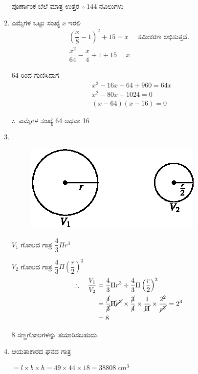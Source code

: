 \begin{enumerate}
ಪೂರ್ಣಾಂಕ ಬೆಲೆ ಮಾತ್ರ ಉತ್ತರ $\therefore~ 144$ ನವಿಲುಗಳು 

\item ಎಮ್ಮೆಗಳ ಒಟ್ಟು ಸಂಖ್ಯೆ $x$ ಇರಲಿ 
\begin{gather*}
\left(\dfrac{x}{8} - 1\right)^{2} + 15 = x \quad\text{ ಸಮೀಕರಣ ಲಭಿಸುತ್ತದೆ.}\\
\dfrac{x^{2}}{64} - \dfrac{x}{4} + 1 + 15 = x
\end{gather*}

64 ರಿಂದ ಗುಣಿಸಿದಾಗ 
\begin{align*}
& x^{2} - 16x + 64 + 960 = 64x\\
& x^{2} - 80x + 1024 = 0\\
& (x - 64) (x - 16) = 0
\end{align*}

$\therefore~$ ಎಮ್ಮೆಗಳ ಸಂಖ್ಯೆ 64 ಅಥವಾ  16

\item 
~

\begin{figure}[H]
\centering
\includegraphics[scale=1.1]{images/chap11/ans20.eps}
\end{figure}

$V_{1}$ ಗೋಲದ ಗಾತ್ರ $\dfrac{4}{3} \Pi r^{3}$

$V_{2}$ ಗೋಲದ ಗಾತ್ರ $\dfrac{4}{3} \Pi \left(\dfrac{r}{2}\right)^{3}$
\begin{align*}
\therefore\quad\dfrac{V_{1}}{V_{2}} & = \dfrac{4}{3}\Pi r^{3} \div {\dfrac{4}{3}\Pi \left(\dfrac{r}{2}\right)^{3}}\\
& = \dfrac{\cancel{4}}{\cancel{3}} \cancel{\Pi} \cancel{r^{3}} \times \dfrac{\cancel{3}}{\cancel{4}} \times \dfrac{1}{\cancel{\Pi}} \times \dfrac{2^{2}}{\cancel{r^{3}}} = 2^{3}\\
& = 8
\end{align*}

8 ಸಣ್ಣಗೋಲಗಳನ್ನು ತಯಾರಿಸಬಹುದು. 

\item ಆಯತಾಕಾರದ ಘನದ ಗಾತ್ರ 

$= l\times b\times h = 49\times 44\times 18 = 38808~cm^{3}$


\end{enumerate}
